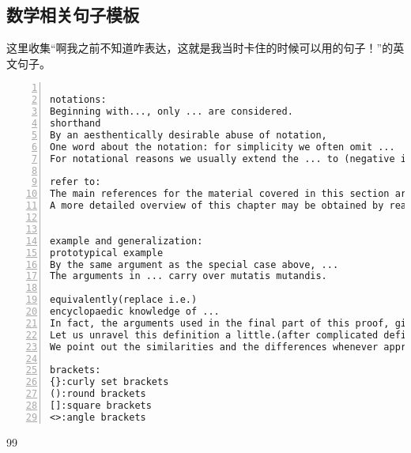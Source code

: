 \documentclass[11pt]{amsart}
\begin{document}
\subsection{数学相关句子模板}
这里收集“啊我之前不知道咋表达，这就是我当时卡住的时候可以用的句子！”的英文句子。
\begin{lstlisting}[numbers=left,numberstyle=\tiny,numbersep=10pt]

notations:
Beginning with..., only ... are considered.
shorthand
By an aesthentically desirable abuse of notation, 
One word about the notation: for simplicity we often omit ...
For notational reasons we usually extend the ... to (negative indices) by defining ...

refer to:
The main references for the material covered in this section are ...
A more detailed overview of this chapter may be obtained by reading the introductions to the various sections.


example and generalization:
prototypical example
By the same argument as the special case above, ...
The arguments in ... carry over mutatis mutandis.

equivalently(replace i.e.)
encyclopaedic knowledge of ...
In fact, the arguments used in the final part of this proof, give the following result.
Let us unravel this definition a little.(after complicated definition)
We point out the similarities and the differences whenever appropriate.

brackets:
{}:curly set brackets
():round brackets
[]:square brackets
<>:angle brackets
\end{lstlisting}



 
   



 








\begin{thebibliography}{99}

 


  

\end{thebibliography}
\end{document}
